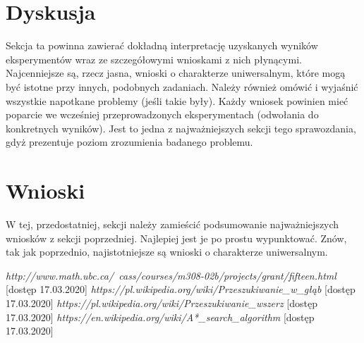 \documentclass{classrep}
\begin{document}
\section{Dyskusja}
{\color{blue}
Sekcja ta powinna zawierać dokładną interpretację uzyskanych wyników
eksperymentów wraz ze szczegółowymi wnioskami z nich płynącymi. Najcenniejsze
są, rzecz jasna, wnioski o charakterze uniwersalnym, które mogą być istotne
przy innych, podobnych zadaniach. Należy również omówić i wyjaśnić wszystkie
napotkane problemy (jeśli takie były). Każdy wniosek powinien mieć poparcie we
wcześniej przeprowadzonych eksperymentach (odwołania do konkretnych wyników).
Jest to jedna z najważniejszych sekcji tego sprawozdania, gdyż prezentuje
poziom zrozumienia badanego problemu.}

\section{Wnioski}
{\color{blue}
W tej, przedostatniej, sekcji należy zamieścić podsumowanie najważniejszych
wniosków z sekcji poprzedniej. Najlepiej jest je po prostu wypunktować. Znów,
tak jak poprzednio, najistotniejsze są wnioski o charakterze uniwersalnym.}

\begin{thebibliography}{0}
  	
	 \textsl{http://www.math.ubc.ca/~cass/courses/m308-02b/projects/grant/fifteen.html} [dostęp 17.03.2020]
	 \textsl{https://pl.wikipedia.org/wiki/Przeszukiwanie\_w\_głąb} [dostęp 17.03.2020]
	 \textsl{https://pl.wikipedia.org/wiki/Przeszukiwanie\_wszerz} [dostęp 17.03.2020]
			\textsl{https://en.wikipedia.org/wiki/A*\_search\_algorithm} [dostęp 17.03.2020]
\end{thebibliography}
\end{document}
